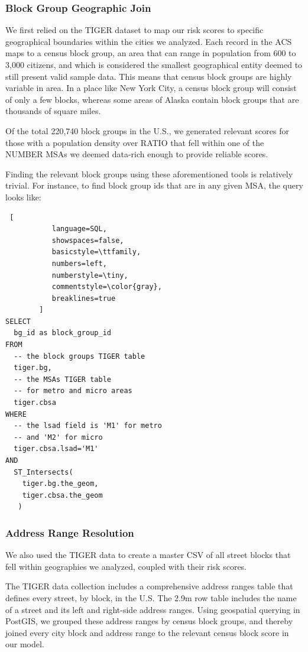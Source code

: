 \documentclass{sig-alternate}
\begin{document}
\subsubsection{Block Group Geographic Join}

We first relied on the TIGER dataset to map our risk scores to specific geographical boundaries within the cities we analyzed. Each record in the ACS maps to a census block group, an area that can range in population from 600 to 3,000 citizens, and which is considered the smallest geographical entity deemed to still present valid sample data. This means that census block groups are highly variable in area. In a place like New York City, a census block group will consist of only a few blocks, whereas some areas of Alaska contain block groups that are thousands of square miles.

Of the total 220,740 block groups in the U.S., we generated relevant scores for those with a population density over RATIO that fell within one of the NUMBER MSAs we deemed data-rich enough to provide reliable scores.

Finding the relevant block groups using these aforementioned tools is relatively trivial. For instance, to find block group ids that are in any given MSA, the query looks like:

\begin{lstlisting} [
           language=SQL,
           showspaces=false,
           basicstyle=\ttfamily,
           numbers=left,
           numberstyle=\tiny,
           commentstyle=\color{gray},
           breaklines=true
        ]
SELECT 
  bg_id as block_group_id
FROM 
  -- the block groups TIGER table
  tiger.bg, 
  -- the MSAs TIGER table
  -- for metro and micro areas
  tiger.cbsa
WHERE 
  -- the lsad field is 'M1' for metro 
  -- and 'M2' for micro
  tiger.cbsa.lsad='M1'
AND
  ST_Intersects(
    tiger.bg.the_geom,
    tiger.cbsa.the_geom
   )
\end{lstlisting}

\subsubsection{Address Range Resolution}

We also used the TIGER data to create a master CSV of all street blocks that fell within geographies we analyzed, coupled with their risk scores.

The TIGER data collection includes a comprehensive address ranges table that defines every street, by block, in the U.S. The 2.9m row table includes the name of a street and its left and right-side address ranges. Using geospatial querying in PostGIS, we grouped these address ranges by census block groups, and thereby joined every city block and address range to the relevant census block score in our model. 
\end{document}
